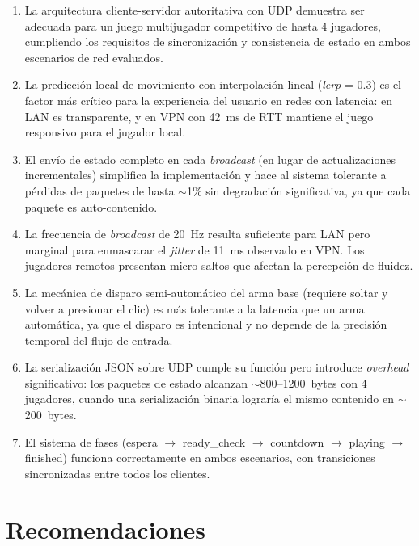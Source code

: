 \documentclass[conference]{IEEEtran}
\begin{document}
\begin{enumerate}
    \item La arquitectura cliente-servidor autoritativa con UDP demuestra ser adecuada para un juego multijugador competitivo de hasta 4 jugadores, cumpliendo los requisitos de sincronizaci\'on y consistencia de estado en ambos escenarios de red evaluados.

    \item La predicci\'on local de movimiento con interpolaci\'on lineal (\textit{lerp} = 0.3) es el factor m\'as cr\'itico para la experiencia del usuario en redes con latencia: en LAN es transparente, y en VPN con 42~ms de RTT mantiene el juego responsivo para el jugador local.

    \item El env\'io de estado completo en cada \textit{broadcast} (en lugar de actualizaciones incrementales) simplifica la implementaci\'on y hace al sistema tolerante a p\'erdidas de paquetes de hasta $\sim$1\% sin degradaci\'on significativa, ya que cada paquete es auto-contenido.

    \item La frecuencia de \textit{broadcast} de 20~Hz resulta suficiente para LAN pero marginal para enmascarar el \textit{jitter} de 11~ms observado en VPN. Los jugadores remotos presentan micro-saltos que afectan la percepci\'on de fluidez.

    \item La mec\'anica de disparo semi-autom\'atico del arma base (requiere soltar y volver a presionar el clic) es m\'as tolerante a la latencia que un arma autom\'atica, ya que el disparo es intencional y no depende de la precisi\'on temporal del flujo de entrada.

    \item La serializaci\'on JSON sobre UDP cumple su funci\'on pero introduce \textit{overhead} significativo: los paquetes de estado alcanzan $\sim$800--1200~bytes con 4 jugadores, cuando una serializaci\'on binaria lograr\'ia el mismo contenido en $\sim$200~bytes.

    \item El sistema de fases (espera $\to$ ready\_check $\to$ countdown $\to$ playing $\to$ finished) funciona correctamente en ambos escenarios, con transiciones sincronizadas entre todos los clientes.
\end{enumerate}

\section{Recomendaciones}
\end{document}
